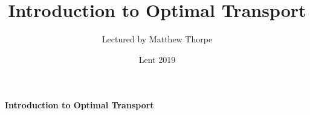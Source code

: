 \documentclass[12pt,a4paper]{article}
\newcommand{\latinmodern}[1]{{\fontfamily{lmss}\selectfont
\textbf{#1}
}}
\DeclarePairedDelimiter\bignorm{\lVert}{\rVert}
\newcommand{\doublerule}[1][.4pt]{%
  \noindent
  \makebox[0pt][l]{\rule[.7ex]{\linewidth}{#1}}%
  \rule[.3ex]{\linewidth}{#1}}
\begin{document}
\title{Introduction to Optimal Transport}
\author{Lectured by Matthew Thorpe}
\date{Lent 2019}

\maketitle

\newcommand{\statement}[1]{\latinmodern{\textbf{#1)}}}

\newcommand{\thm}{\statement{Theorem}}
\newcommand{\thmnum}[1]{\statement{Theorem #1}}
\newcommand{\defi}{\statement{Definition}}
\newcommand{\definum}[1]{\statement{Definition #1}}
\newcommand{\lem}{\statement{Lemma}}
\newcommand{\lemnum}[1]{\statement{Lemma #1}}
\newcommand{\prop}{\statement{Proposition}}
\newcommand{\propnum}[1]{\statement{Proposition #1}}
\newcommand{\corr}{\statement{Corollary}}
\newcommand{\corrnum}[1]{\statement{Corollary #1}}
\newcommand{\pf}{\textbf{proof) }}

\newcommand{\norms}[2]{\bignorm[\big]{#1}_{#2}}
\newcommand{\snorms}[2]{\bignorm[\small]{#1}_{#2}}
\newcommand{\charac}{\bm{1}}
\newcommand{\wa}[1]{ d_{ \mathrel{\scalebox{0.5}[0.5]{$W$}}^{#1}}}

\newcommand{\lap}{\triangle} %
\newcommand{\s}{\vspace{10pt}}
\newcommand{\bull}{$\bullet$}
\newcommand{\sta}{$\star$}
\newcommand{\reals}{\mathbb{R}}

\newcommand{\eop}{\hfill  \textsl{(End of proof)} $\square$} %
\newcommand{\eos}{\hfill  \textsl{(End of statement)} $\square$} %

\newcommand{\call}[1]{\quad \cdots\cdots\cdots\,\,(#1)}

\newcommand{\intN}{\mathbb{Z}_N}
\newcommand{\nat}{\mathbb{N}}
\newcommand{\abs}[1]{\big| #1 \big|}
\newcommand{\avg}{\mathbb{E}}
\newcommand{\prob}{\mathbb{P}}
\newcommand{\borel}{\mathscr{B}}
\newcommand{\EE}{\mathscr{E}}
\newcommand{\pa}{\partial}
\newcommand{\PP}{\mathscr{P}}
\newcommand{\pgi}{\text{P}_{\text{GI}}}

\renewcommand{\vec}{\underline}
\renewcommand{\bar}{\overline}

\def\doubleunderline#1{\underline{\underline{#1}}}

\newcommand{\newday}{\doublerule[0.5pt]}
\newcommand{\digression}{**********************************************************************************************}

\setlength\parindent{0pt}

\textbf{Introduction to Optimal Transport}
\end{document}
